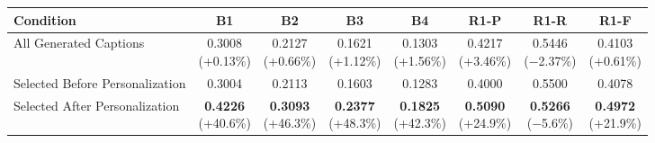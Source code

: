 \documentclass{article} %
\begin{document}
\begin{table}[t]
\centering
\scriptsize
\renewcommand{\arraystretch}{0.95}

\begin{subtable}{\linewidth}
\centering
{}
\begin{adjustbox}{max width=0.95\textwidth}
\begin{tabular}{lccccccc}
\toprule
\textbf{Condition} & B1 & B2 & B3 & B4 & R1-P & R1-R & R1-F \\
\midrule
All Generated Captions & \makecell{0.3008 \\ (+0.13\%)} & \makecell{0.2127 \\ (+0.66\%)} & \makecell{0.1621 \\ (+1.12\%)} & \makecell{0.1303 \\ (+1.56\%)} 
& \makecell{0.4217 \\ (+3.46\%)} & \makecell{0.5446 \\ (−2.37\%)} & \makecell{0.4103 \\ (+0.61\%)} \\
Selected Before Personalization & 0.3004 & 0.2113 & 0.1603 & 0.1283 & 0.4000 & 0.5500 & 0.4078 \\
Selected After Personalization & \makecell{\textbf{0.4226} \\ (+40.6\%)} & \makecell{\textbf{0.3093} \\ (+46.3\%)} & \makecell{\textbf{0.2377} \\ (+48.3\%)} & \makecell{\textbf{0.1825} \\ (+42.3\%)} 
& \makecell{\textbf{0.5090} \\ (+24.9\%)} & \makecell{\textbf{0.5266} \\ (−5.6\%)} & \makecell{\textbf{0.4972} \\ (+21.9\%)} \\
\bottomrule
\end{tabular}
\end{adjustbox}
\end{subtable}


\end{table}
\end{document}
